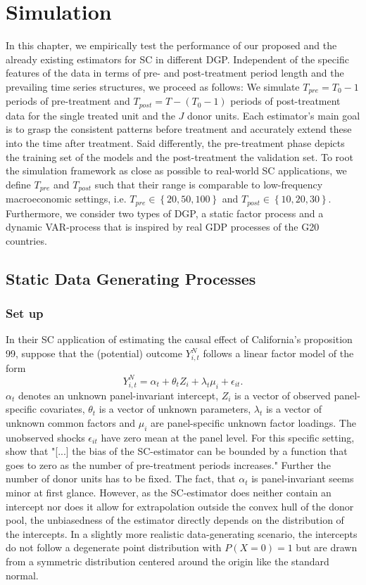 \section{Simulation}
In this chapter, we empirically test the performance of our proposed and the already existing estimators for \ac{SC} in different \ac{DGP}. Independent of the specific features of the data in terms of pre- and post-treatment period length and the prevailing time series structures, we proceed as follows: We simulate $T_{pre} = T_0 -1$ periods of pre-treatment and $T_{post} = T - (T_0 -1)$ periods of post-treatment data for the single treated unit and the $J$ donor units. Each estimator's main goal is to grasp the consistent patterns before treatment and accurately extend these into the time after treatment. Said differently, the pre-treatment phase depicts the training set of the models and the post-treatment the validation set. To root the simulation framework as close as possible to real-world \ac{SC} applications, we define $T_{pre}$ and $T_{post}$ such that their range is comparable to low-frequency macroeconomic settings, i.e. $T_{pre} \in \left\lbrace 20,50,100\right\rbrace $ and $T_{post} \in \left\lbrace 10,20,30\right\rbrace$. Furthermore, we consider two types of \ac{DGP}, a static factor process and a dynamic \ac{VAR}-process that is inspired by real \ac{GDP} processes of the G20 countries.

\subsection{Static Data Generating Processes}
\subsubsection{Set up}
In their \ac{SC} application of estimating the causal effect of California's proposition 99, \cite{abadie:2010} suppose that the (potential) outcome $Y_{i,t}^{N}$ follows a linear factor model of the  form 
\begin{equation*}
	Y_{i,t}^{N} = \alpha_t + \theta_t Z_i + \lambda_t \mu_i + \epsilon_{it}.
\end{equation*}
$\alpha_t$ denotes an unknown panel-invariant intercept, $Z_i$ is a vector of observed panel-specific covariates, $\theta_t$ is a vector of unknown parameters, $\lambda_t$ is a vector of unknown common factors and $\mu_i$ are panel-specific unknown factor loadings. The unobserved shocks $\epsilon_{it}$ have zero mean at the panel level. 
For this specific setting, \cite{abadie:2010} show that "[...] the bias of the SC-estimator can be bounded by a function that goes to zero as the number of pre-treatment periods increases." Further the number of donor units has to be fixed. The fact, that $\alpha_t$ is panel-invariant seems minor at first glance. However, as the \ac{SC}-estimator does neither contain an intercept nor does it allow for extrapolation outside the convex hull of the donor pool, the unbiasedness of the estimator directly depends on the distribution of the intercepts. In a slightly more realistic data-generating scenario, the intercepts do not follow a degenerate point distribution with $P(X = 0) = 1$ but are drawn from a symmetric distribution centered around the origin like the standard normal. 

